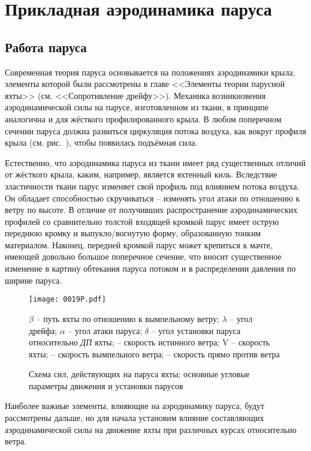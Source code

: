 \chapter{Прикладная аэродинамика паруса}\label{chap:2}

\section{Работа паруса}

Современная теория паруса основывается на положениях аэродинамики крыла, элементы которой были рассмотрены в главе <<Элементы теории парусной яхты>> (см. <<Сопротивление дрейфу>>). Механика возникновения аэродинамической силы на парусе, изготовленном из ткани, в принципе аналогична и для жёсткого профилированного крыла. В любом поперечном сечении паруса должна развиться циркуляция потока воздуха, как вокруг профиля крыла (см. рис.~), чтобы появилась подъёмная сила.

Естественно, что аэродинамика паруса из ткани имеет ряд существенных отличий от жёсткого крыла, каким, например, является яхтенный киль. Вследствие эластичности ткани парус изменяет свой профиль под влиянием потока воздуха. Он обладает способностью скручиваться \--- изменять угол атаки по отношению к ветру по высоте. В отличие от получивших распространение аэродинамических профилей со сравнительно толстой входящей кромкой парус имеет острую переднюю кромку и выпукло\-/вогнутую форму, образованную тонким материалом. Наконец, передней кромкой парус может крепиться к мачте, имеющей довольно большое поперечное сечение, что вносит существенное изменение в картину обтекания паруса потоком и в распределении давления по ширине паруса.

\begin{figure}[htb]
  \centering
  \texttt{[image: 0019P.pdf]}
  \caption{Схема сил, действующих на паруса яхты; основные угловые параметры движения и установки парусов}
  \label{fig:19}
  \centering{}
  \small
  $\beta$ \--- путь яхты по отношению к вымпельному ветру; $\lambda$ \--- угол дрейфа; $\alpha$ \--- угол атаки паруса; $\delta$ \--- угол установки паруса относительно \textit{ДП} яхты;  \--- скорость истинного ветра; \ve V \--- скорость яхты;  \--- скорость вымпельного ветра;  \--- скорость прямо против ветра
\end{figure}

Наиболее важные элементы, влияющие на аэродинамику паруса, будут рассмотрены дальше, но для начала установим влияние составляющих аэродинамической силы на движение яхты при различных курсах относительно ветра.

